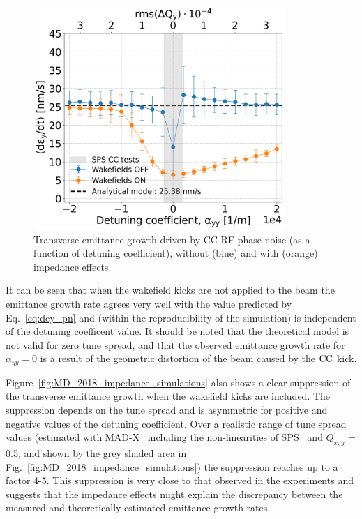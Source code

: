 \begin{figure}[!h] %
    \centering         
    \includegraphics[width=0.85\textwidth]{images/Ch7/deyRates_final_2018_PN_sps_270GeV_PN1e-8_400MHz_y-plane_QpxQpy5e-1_6D_Nb5e5_intensity3e10_ayyScan_wakesON_vs_OFF_vs_TuneSpreadvsExpectedSPS.png}
        \caption{Transverse emittance growth driven by CC RF phase noise (as a function of detuning coefficient), without (blue) and with (orange) impedance effects.}
        \label{fig:MD_2018_impedance_simulations_amplitude_detuning}
 \end{figure}

It can be seen that when the wakefield kicks are not applied to the beam the emittance growth rate agrees very well with the value predicted by Eq.~\eqref{eq:dey_pn} and (within the reproducibility of the simulation) is independent of the detuning coefficent value. It should be noted that the theoretical model is not valid for zero tune spread, and that the observed emittance growth rate for $\alpha_{yy} = 0$ is a result of the geometric distortion of the beam caused by the ${\mathrm{CC}}$ kick.

Figure~\ref{fig:MD_2018_impedance_simulations} also shows a clear suppression of the transverse emittance growth when the wakefield kicks are included. The suppression depends on the tune spread and is asymmetric for positive and negative values of the detuning coefficient. Over a realistic range of tune spread values (estimated with MAD-X~\cite{madx} including the non-linearities of SPS~\cite{Carlà:2664976, Alekou:2640326} and $Q^\prime_{x,y}$ = 0.5, and shown by the grey shaded area in Fig.~\ref{fig:MD_2018_impedance_simulations}) the suppression reaches up to a factor 4-5. This suppression is very close to that observed in the experiments and suggests that the impedance effects might explain the discrepancy between the measured and theoretically estimated emittance growth rates.


